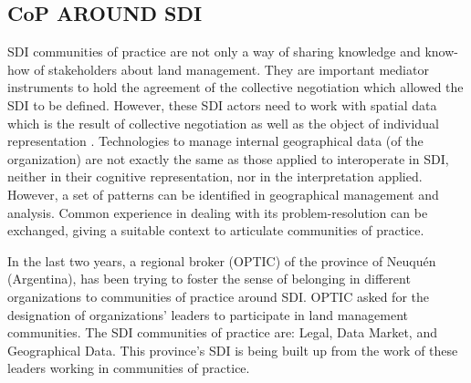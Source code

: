 \documentclass[10pt,twocolumn,ieeetran]{article}
\begin{document}

\subsection{CoP AROUND SDI}


SDI communities of practice are not only a way of sharing knowledge and know-how of stakeholders about land management. They are important mediator instruments to hold the agreement of the collective negotiation which allowed  the SDI to be defined. However, these SDI actors need to work with spatial data which is the result of collective negotiation as well as the object of individual representation \cite{Noucher1}. Technologies to manage internal geographical data (of the organization) are not exactly the same as those applied to interoperate in SDI, neither in their cognitive representation, nor in the interpretation applied. However, a set of patterns can be identified in geographical management and analysis. Common experience in dealing with its problem-resolution can be exchanged, giving a suitable context to articulate communities of practice.  

In the last two years, a regional broker (OPTIC) of the province of Neuqu\' en (Argentina), has been trying to foster the sense of belonging in different organizations to communities of practice around SDI.
OPTIC asked for the designation of organizations' leaders to participate in land management communities. The SDI communities of practice are: Legal, Data Market, and Geographical Data. This province's SDI is being built up from the work of these leaders working in communities of practice.
\end{document}
